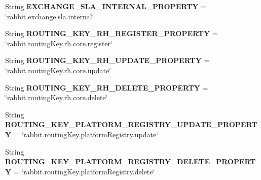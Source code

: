 \begin{DoxyCompactItemize}
\item 
\mbox{\label{interfaceeu_1_1h2020_1_1symbiote_1_1util_1_1RabbitConstants_aea608f203bd850a5d83034c2eb66ff64}} 
String {\bfseries E\+X\+C\+H\+A\+N\+G\+E\+\_\+\+S\+L\+A\+\_\+\+I\+N\+T\+E\+R\+N\+A\+L\+\_\+\+P\+R\+O\+P\+E\+R\+TY} = \char`\"{}rabbit.\+exchange.\+sla.\+internal\char`\"{}
\item 
\mbox{\label{interfaceeu_1_1h2020_1_1symbiote_1_1util_1_1RabbitConstants_a5b0d1fb7e579f128a66c24373beb60f2}} 
String {\bfseries R\+O\+U\+T\+I\+N\+G\+\_\+\+K\+E\+Y\+\_\+\+R\+H\+\_\+\+R\+E\+G\+I\+S\+T\+E\+R\+\_\+\+P\+R\+O\+P\+E\+R\+TY} = \char`\"{}rabbit.\+routing\+Key.\+rh.\+core.\+register\char`\"{}
\item 
\mbox{\label{interfaceeu_1_1h2020_1_1symbiote_1_1util_1_1RabbitConstants_a0c066d3dfae50fb65cdd91570d6d2b2f}} 
String {\bfseries R\+O\+U\+T\+I\+N\+G\+\_\+\+K\+E\+Y\+\_\+\+R\+H\+\_\+\+U\+P\+D\+A\+T\+E\+\_\+\+P\+R\+O\+P\+E\+R\+TY} = \char`\"{}rabbit.\+routing\+Key.\+rh.\+core.\+update\char`\"{}
\item 
\mbox{\label{interfaceeu_1_1h2020_1_1symbiote_1_1util_1_1RabbitConstants_a3f68dbc052b719d0e4576c2eb058db15}} 
String {\bfseries R\+O\+U\+T\+I\+N\+G\+\_\+\+K\+E\+Y\+\_\+\+R\+H\+\_\+\+D\+E\+L\+E\+T\+E\+\_\+\+P\+R\+O\+P\+E\+R\+TY} = \char`\"{}rabbit.\+routing\+Key.\+rh.\+core.\+delete\char`\"{}
\item 
\mbox{\label{interfaceeu_1_1h2020_1_1symbiote_1_1util_1_1RabbitConstants_ac686f9808c1dec9f33f8d95ef46df8ed}} 
String {\bfseries R\+O\+U\+T\+I\+N\+G\+\_\+\+K\+E\+Y\+\_\+\+P\+L\+A\+T\+F\+O\+R\+M\+\_\+\+R\+E\+G\+I\+S\+T\+R\+Y\+\_\+\+U\+P\+D\+A\+T\+E\+\_\+\+P\+R\+O\+P\+E\+R\+TY} = \char`\"{}rabbit.\+routing\+Key.\+platform\+Registry.\+update\char`\"{}
\item 
\mbox{\label{interfaceeu_1_1h2020_1_1symbiote_1_1util_1_1RabbitConstants_a80d995795424d0283ba8fcc39ea16c72}} 
String {\bfseries R\+O\+U\+T\+I\+N\+G\+\_\+\+K\+E\+Y\+\_\+\+P\+L\+A\+T\+F\+O\+R\+M\+\_\+\+R\+E\+G\+I\+S\+T\+R\+Y\+\_\+\+D\+E\+L\+E\+T\+E\+\_\+\+P\+R\+O\+P\+E\+R\+TY} = \char`\"{}rabbit.\+routing\+Key.\+platform\+Registry.\+delete\char`\"{}

\end{DoxyCompactItemize}
